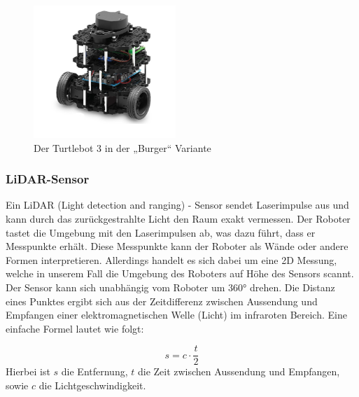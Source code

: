 {{{			\begin{figure}[H]
				\centering
				\includegraphics[height=5cm]{Bilder/turtlebot_3_burger.png}
				\caption{Der Turtlebot 3 in der „Burger“ Variante \\ \parencite{turtlebot3burger001}} 
				\label{pic:turtle3burger}
			\end{figure}
			
		}
		
		\subsubsection{LiDAR-Sensor}
		{
			Ein LiDAR (Light detection and ranging) - Sensor sendet Laserimpulse aus und kann durch das zurückgestrahlte Licht den Raum exakt vermessen. Der Roboter tastet die Umgebung mit den Laserimpulsen ab, was dazu führt, dass er Messpunkte erhält. Diese Messpunkte kann der Roboter als Wände oder andere Formen interpretieren. Allerdings handelt es sich dabei um eine 2D Messung, welche in unserem Fall die Umgebung des Roboters auf Höhe des Sensors scannt. Der Sensor kann sich unabhängig vom Roboter um 360° drehen. 
			Die Distanz eines Punktes ergibt sich aus der Zeitdifferenz zwischen Aussendung und Empfangen einer elektromagnetischen Welle (Licht) im infraroten Bereich.
			Eine einfache Formel lautet wie folgt:
			
			\begin{equation}
				s = c \cdot \frac{t}{2}
			\end{equation} 
			Hierbei ist $s$ die Entfernung, $t$ die Zeit zwischen Aussendung und Empfangen, sowie $c$ die Lichtgeschwindigkeit.
			
}}}
